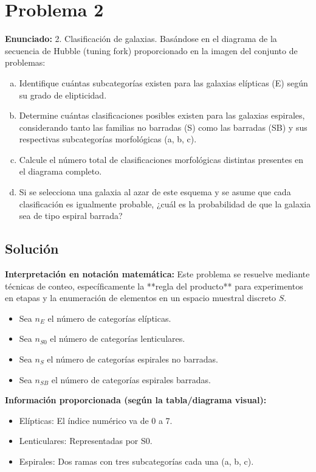 \documentclass[a4paper]{article}
\begin{document}
\section{Problema 2}
\textbf{Enunciado:}
2. Clasificación de galaxias. Basándose en el diagrama de la secuencia de Hubble (tuning fork) proporcionado en la imagen del conjunto de problemas:
\begin{enumerate}[a.]
    \item Identifique cuántas subcategorías existen para las galaxias elípticas (E) según su grado de elipticidad.
    \item Determine cuántas clasificaciones posibles existen para las galaxias espirales, considerando tanto las familias no barradas (S) como las barradas (SB) y sus respectivas subcategorías morfológicas (a, b, c).
    \item Calcule el número total de clasificaciones morfológicas distintas presentes en el diagrama completo.
    \item Si se selecciona una galaxia al azar de este esquema y se asume que cada clasificación es igualmente probable, ¿cuál es la probabilidad de que la galaxia sea de tipo espiral barrada?
\end{enumerate}

\subsection*{Solución}

\textbf{Interpretación en notación matemática:}
Este problema se resuelve mediante técnicas de conteo, específicamente la **regla del producto** para experimentos en etapas y la enumeración de elementos en un espacio muestral discreto $S$.

\begin{itemize}
    \item Sea $n_E$ el número de categorías elípticas.
    \item Sea $n_{S0}$ el número de categorías lenticulares.
    \item Sea $n_S$ el número de categorías espirales no barradas.
    \item Sea $n_{SB}$ el número de categorías espirales barradas.
\end{itemize}

\textbf{Información proporcionada (según la tabla/diagrama visual):}
\begin{itemize}
    \item Elípticas: El índice numérico va de 0 a 7.
    \item Lenticulares: Representadas por S0.
    \item Espirales: Dos ramas con tres subcategorías cada una (a, b, c).
\end{itemize}
\end{document}
